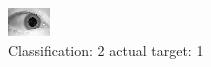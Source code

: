 \begin{figure}[h!]
\begin{center}
\includegraphics[width=0.60\columnwidth]{figures/ID1480_class_2_target_1.png}
\end{center}
\caption{ Classification: 2 actual target: 1}
\label{fig:ID1480_class_2_target_1}
\end{figure}
